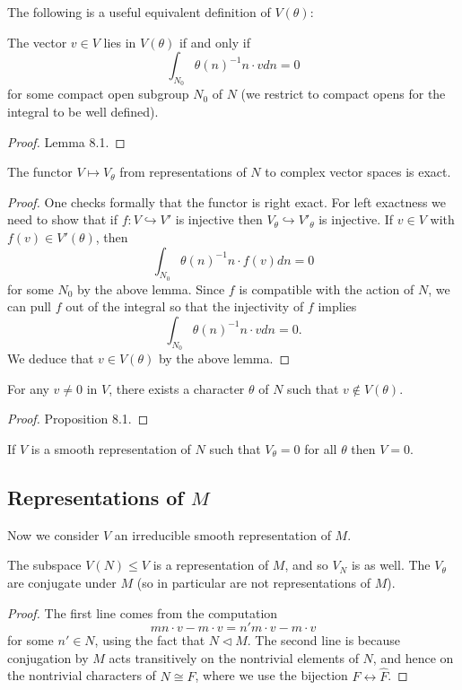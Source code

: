 The following is a useful equivalent definition of $V(\theta)$:

\begin{lemma}\label{criteria N}
    The vector $v \in V$ lies in $V(\theta)$ if and only if 
    $$\int_{N_0} \theta(n)^{-1}  n \cdot v dn = 0$$
    for some compact open subgroup $N_0$ of $N$ (we restrict to compact opens for the integral to be well defined).
\end{lemma}
\begin{proof}
    \cite{BH1} Lemma 8.1.
\end{proof}

\begin{cor}\label{exact}
    The functor $V \mapsto V_\theta$ from representations of $N$ to complex vector spaces is exact.
\end{cor}
\begin{proof}
    One checks formally that the functor is right exact. For left exactness we need to show that if $f: V \hookrightarrow V'$ is injective then $V_\theta \hookrightarrow V'_\theta$ is injective. If $v \in V$ with $f(v) \in V'(\theta)$, then 
    $$\int_{N_0} \theta(n)^{-1}n \cdot f(v) dn = 0$$
    for some $N_0$ by the above lemma. Since $f$ is compatible with the action of $N$, we can pull $f$ out of the integral so that the injectivity of $f$ implies
    $$\int_{N_0} \theta(n)^{-1}n \cdot v dn = 0.$$
    We deduce that $v \in V(\theta)$ by the above lemma.
\end{proof}

\begin{prop}
    For any $v \neq 0$ in $V$, there exists a character $\theta$ of $N$ such that $v \not\in V(\theta)$.
\end{prop}
\begin{proof}
    \cite{BH1} Proposition 8.1.
\end{proof}

\begin{cor}\label{character}
    If $V$ is a smooth representation of $N$ such that $V_\theta=0$ for all $\theta$ then $V=0$.
\end{cor}


\subsection{Representations of $M$}

Now we consider $V$ an irreducible smooth representation of $M$. 

\begin{lemma}\label{coinvariants}
    The subspace $V(N) \leq V$ is a representation of $M$, and so $V_N$ is as well. The $V_\theta$ are conjugate under $M$ (so in particular are not representations of $M$). 
\end{lemma}
\begin{proof}
    The first line comes from the computation 
    $$mn\cdot v - m\cdot v = n'm\cdot v - m\cdot v$$ for some $n' \in N$, using the fact that $N \lhd M$. The second line is because conjugation by $M$ acts transitively on the nontrivial elements of $N$, and hence on the nontrivial characters of $N \cong F$, where we use the bijection $F \leftrightarrow \hat{F}$.
\end{proof}

